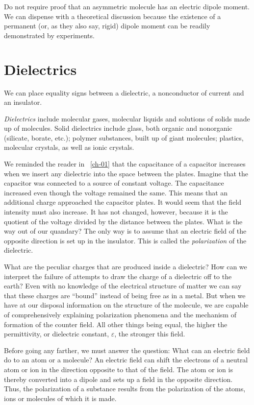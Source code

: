 Do not require proof that an asymmetric molecule has an electric dipole moment. We can dispense with a theoretical discussion because the existence of a permanent (or, as they also say, rigid) dipole moment can be readily demonstrated by experiments.

\section{Dielectrics}

We can place equality signs between a dielectric, a nonconductor of current and an insulator.

\emph{Dielectrics} include molecular gases, molecular liquids and solutions of solids made up of molecules. Solid dielectrics include glass, both organic and nonorganic (silicate, borate, etc.); polymer substances, built up of giant molecules; plastics, molecular crystals, as well as ionic crystals.

We reminded the reader in ~\ref{ch-01} that the capacitance of a capacitor increases when we insert any dielectric into the space between the plates. Imagine that the capacitor was connected to a source of constant voltage. The capacitance increased even though the voltage remained the same. This means that an additional charge approached the capacitor plates. It would seem that the field intensity must also increase. It has not changed, however, because it is the quotient of the voltage divided by the distance between the plates. What is the way out of our quandary? The only way is to assume that an electric field of the opposite direction is set up in the insulator. This is called the \emph{polarization} of the dielectric. 

What are the peculiar charges that are produced inside a dielectric? How can we interpret the failure of attempts to draw the charge of a dielectric off to the earth? Even with no knowledge of the electrical structure of matter we can say that these charges are ``bound'' instead of being free as in a metal. But when we have at our disposal information on the structure of the molecule, we are capable of comprehensively explaining polarization phenomena and the mechanism of formation of the counter field. All other things being equal, the higher the permittivity, or dielectric constant, $\varepsilon$, the stronger this field.

Before going any farther, we must answer the question: What can an electric field do to an atom or a molecule? An electric field can shift the electrons of a neutral atom or ion in the direction opposite to that of the field. The atom or ion is thereby converted into a dipole and sets up a field in the opposite direction. Thus, the polarization of a substance results from the polarization of the atoms, ions or molecules of which it is made.

